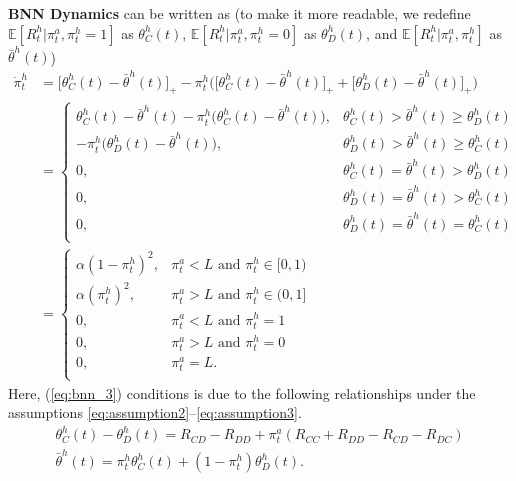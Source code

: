 \documentclass[letterpaper]{article} %
\begin{document}
\textbf{BNN Dynamics} can be written as (to make it more readable, we redefine $\mathbb{E}[R^h_t|\pi^a_t, \pi^h_t = 1]$ as $\theta_C^h(t)$, $\mathbb{E}[R^h_t|\pi^a_t, \pi^h_t = 0]$ as $\theta_D^h(t)$, and $\mathbb{E}[R^h_t|\pi^a_t,\pi^h_t]$ as $\bar{\theta}^h(t)$)
\begin{align}
\dot{\pi}^h_{t} &= 
 \bigg[\theta_C^h(t) - \bar{\theta}^h(t) \bigg]_{+} - \pi^h_{t} \bigg( \bigg[\theta_C^h(t) - \bar{\theta}^h(t) \bigg]_{+} + \bigg[\theta_D^h(t) - \bar{\theta}^h(t) \bigg]_{+} \bigg) \label{eq:bnn_1}\\
 &= \begin{cases}
	      \theta_C^h(t) - \bar{\theta}^h(t) - \pi^h_t \bigg(\theta_C^h(t) - \bar{\theta}^h(t)\bigg),  & \theta_C^h(t) > \bar{\theta}^h(t) \geq \theta_D^h(t) \\
	       - \pi^h_t \bigg(\theta_D^h(t) - \bar{\theta}^h(t)\bigg), & \theta_D^h(t) > \bar{\theta}^h(t) \geq \theta_C^h(t) \\
	      0,  &  \theta_C^h(t) = \bar{\theta}^h(t) > \theta_D^h(t) \\
	       0, &  \theta_D^h(t) = \bar{\theta}^h(t) > \theta_C^h(t) \\	       
	       0, &  \theta_D^h(t) = \bar{\theta}^h(t) = \theta_C^h(t) \\
    \end{cases} \label{eq:bnn_2} \\
&= \left\{
	\begin{array}{ll}
	       \alpha (1-\pi_t^h)^2, & \pi^a_t < L \text{ and } \pi_t^h \in [0,1) \\
	       \alpha (\pi_t^h)^2, &  \pi^a_t > L \text{ and } \pi_t^h \in (0,1]  \\
	       0,  &  \pi^a_t < L \text{ and } \pi^h_t = 1 \\
	       0, &  \pi^a_t > L \text{ and } \pi^h_t = 0 \\
	       0, & \pi^a_t = L.\\
	\end{array}
\right. \label{eq:bnn_3}
\end{align}
Here, (\ref{eq:bnn_3}) conditions is due to the following relationships under the assumptions \eqref{eq:assumption2}--\eqref{eq:assumption3}.
\begin{gather}
    \theta_C^h(t) - \theta_D^h(t) =  R_{CD} - R_{DD} + \pi^a_t (R_{CC} +R_{DD}-R_{CD}-R_{DC}) \\
\bar{\theta}^h(t) = \pi^h_t \theta_C^h(t) + (1 - \pi^h_t) \theta_D^h(t).
\end{gather}
\end{document}
